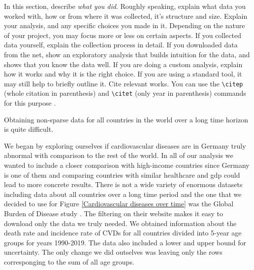 In this section, describe \emph{what you did}. Roughly speaking, explain what data you worked with, how or from where it was collected, it's structure and size. Explain your analysis, and any specific choices you made in it. Depending on the nature of your project, you may focus more or less on certain aspects. If you collected data yourself, explain the collection process in detail. If you downloaded data from the net, show an exploratory analysis that builds intuition for the data, and shows that you know the data well. If you are doing a custom analysis, explain how it works and why it is the right choice. If you are using a standard tool, it may still help to briefly outline it. Cite relevant works. You can use the \verb|\citep| (whole citation in parenthesis) and \verb|\citet| (only year in parenthesis) commands for this purpose \citep{mackay2003information}.

% 

Obtaining non-sparse data for all countries in the world over a long time horizon is quite difficult.

We began by exploring ourselves if cardiovascular diseases are in Germany truly abnormal with comparison to the rest of the world. In all of our analysis we wanted to include a closer comparison with high-income countries since Germany is one of them and comparing countries with similar healthcare and gdp could lead to more concrete results. There is not a wide variety of enormous datasets including data about all countries over a long time period and the one that we decided to use for Figure \ref{Cardiovascular diseases over time} was the Global Burden of Disease study \citep{GBD2019}. The filtering on their website makes it easy to download only the data we truly needed. We obtained information about the death rate and incidence rate of CVDs for all countries divided into 5-year age groups for years 1990-2019. The data also included a lower and upper bound for uncertainty. The only change we did outselves was leaving only the rows corresponging to the sum of all age groups.

